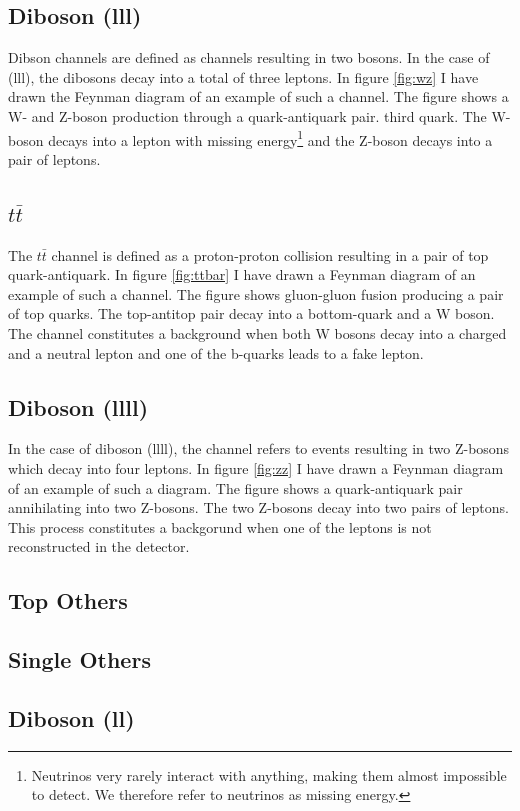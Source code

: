 \subsection{Diboson (lll)}
Dibson channels are defined as channels resulting in two bosons. In the case of (lll), the dibosons
decay into a total of three leptons. In figure \ref{fig:wz} I have drawn the Feynman diagram of an 
example of such a channel. The figure shows a W- and Z-boson production through a quark-antiquark pair.
third quark. The W-boson decays into a lepton with missing energy\footnote{Neutrinos very rarely interact
with anything, making them almost impossible to detect. We therefore refer to neutrinos as missing energy.}
and the Z-boson decays into a pair of leptons. 

\subsection{$t\bar{t}$}
The $t\bar{t}$ channel is defined as a proton-proton collision resulting in a pair of top quark-antiquark. 
In figure \ref{fig:ttbar} I have drawn a Feynman diagram of an example of such a channel. The figure 
shows gluon-gluon fusion producing a pair of top quarks. The top-antitop pair decay into a bottom-quark 
and a W boson. The channel constitutes a background when both W bosons decay into a charged and a neutral 
lepton and one of the b-quarks leads to a fake lepton.

\subsection{Diboson (llll)}
In the case of diboson (llll), the channel refers to events resulting in two Z-bosons which decay 
into four leptons. In figure \ref{fig:zz} I have drawn a Feynman diagram of an example of 
such a diagram. The figure shows a quark-antiquark pair annihilating into two Z-bosons.
The two Z-bosons decay into two pairs of leptons. This process constitutes a backgorund when one 
of the leptons is not reconstructed in the detector.


\subsection{Top Others}
\subsection{Single Others}
\subsection{Diboson (ll)}
